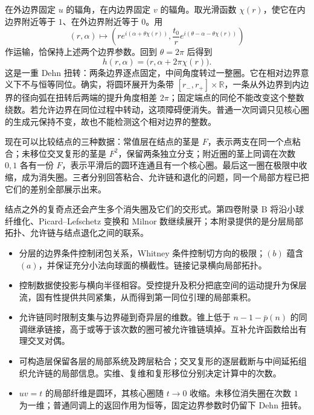 \ProseParagraphBreak

在外边界固定 \(u\) 的辐角，在内边界固定 \(v\) 的辐角。取光滑函数 \(\chi(r)\)，使它在内边界附近等于 \(1\)、在外边界附近等于 \(0\)。用
\[
	(r,\alpha)\longmapsto
	\left(r e^{i(\alpha+\theta\chi(r))},
	\frac{t_0}{r}e^{i(\theta-\alpha-\theta\chi(r))}\right)
\]
作运输，恰保持上述两个边界参数。回到 \(\theta=2\pi\) 后得到
\begin{equation}\label{g2:eq:nodal-dehn-twist}
	h(r,\alpha)=\bigl(r,\alpha+2\pi\chi(r)\bigr).
\end{equation}
这是一重 Dehn 扭转：两条边界逐点固定，中间角度转过一整圈。它在相对边界意义下不与恒等同位。确实，将圆环展开为条带 \([r_-,r_+]\times\mathbb R\)，一条从外边界到内边界的径向弧在扭转后两端的提升角度相差 \(2\pi\)；固定端点的同伦不能改变这个整数绕数。若允许边界在同位过程中转动，这项障碍便消失。普通一次同调只见核心圈的生成元保持不变，故也不能检测这个相对边界的整数。

\ProseParagraphBreak

现在可以比较结点的三种数据：常值层在结点的茎是 \(F\)，表示两支在同一个点粘合；未移位交叉复形的茎是 \(F^2\)，保留两条独立分支；附近圈的茎上同调在次数 \(0,1\) 各有一份 \(F\)，表示平滑后的圆环连通且有一个核心圈。最后这一圈在极限中收缩，成为消失圈。三者分别回答粘合、允许链和退化的问题，同一个局部方程已把它们的差别全部展示出来。


结点之外的复奇点还会产生多个消失圈及它们的交形式。第四卷附录 B 将沿小球纤维化、Picard--Lefschetz 变换和 Milnor 数继续展开；本附录提供的是分层局部拓扑、允许链与结点退化之间的联系。

\begin{chaptersummary}
	\begin{itemize}
		\item 分层的边界条件控制闭包关系，Whitney 条件控制切方向的极限；\((b)\) 蕴含 \((a)\)，并保证充分小法向球面的横截性。链接记录横向局部拓扑。
		\item 控制数据使投影与横向半径相容。受控提升及积分把底空间的运动提升为保层流，固有性提供共同紧集，从而得到第一同位引理的局部乘积。
		\item 允许链同时限制支集与边界碰到奇异层的维数。锥上低于 \(n-1-\bar p(n)\) 的同调继承链接，高于或等于该次数的圈可被允许锥链填掉。互补允许函数给出有理交叉对偶。
		\item 可构造层保留各层的局部系统及跨层粘合；交叉复形的逐层截断与中间延拓组织允许链的局部信息。实维、复维和复形移位分别决定计算中的次数。
		\item \(uv=t\) 的局部纤维是圆环，其核心圈随 \(t\to0\) 收缩。未移位消失圈在次数 \(1\) 为一维；普通同调上的返回作用为恒等，固定边界参数时仍留下 Dehn 扭转。
	\end{itemize}
\end{chaptersummary}

